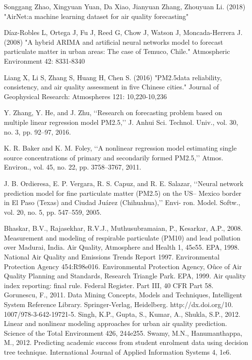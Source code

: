 \begin{thebibliography}{99}
Songgang Zhao, Xingyuan Yuan, Da Xiao, Jianyuan Zhang, Zhouyuan Li. (2018) "AirNet:a machine learning dataset for air quality
forecasting"

Díaz-Robles L, Ortega J, Fu J, Reed G, Chow J, Watson J, Moncada-Herrera J. (2008) "A hybrid ARIMA and artificial neural networks
model to forecast particulate matter in urban areas: The case of Temuco, Chile." Atmospheric Environment 42: 8331-8340

Liang X, Li S, Zhang S, Huang H, Chen S. (2016) "PM2.5data reliability, consistency, and air quality assessment in five Chinese cities."
Journal of Geophysical Research: Atmospheres 121: 10,220-10,236

Y. Zhang, Y. He, and J. Zhu, ‘‘Research on forecasting problem based
on multiple linear regression model PM2.5,’’ J. Anhui Sci. Technol. Univ.,
vol. 30, no. 3, pp. 92–97, 2016.

K. R. Baker and K. M. Foley, ‘‘A nonlinear regression model estimating
single source concentrations of primary and secondarily formed PM2.5,’’
Atmos. Environ., vol. 45, no. 22, pp. 3758–3767, 2011.

J. B. Ordieresa, E. P. Vergara, R. S. Capuz, and R. E. Salazar, ‘‘Neural
network prediction model for fine particulate matter (PM2.5) on the US–
Mexico border in El Paso (Texas) and Ciudad Juárez (Chihuahua),’’ Envi-
ron. Model. Softw., vol. 20, no. 5, pp. 547–559, 2005.

Bhaskar, B.V., Rajasekhar, R.V.J., Muthusubramaian, P., Kesarkar, A.P., 2008. Measurement and modeling of respirable particulate (PM10) and lead pollution over
Madurai, India. Air Quality, Atmosphere and Health 1, 45e55.
EPA, 1998. National Air Quality and Emissions Trends Report 1997. Environmental
Protection Agency 454:R98e016. Environmental Protection Agency, Oûce of Air
Quality Planning and Standards, Research Triangle Park.
EPA, 1999. Air quality index reporting: final rule. Federal Register. Part III, 40 CFR
Part 58.
Gorunescu, F., 2011. Data Mining Concepts, Models and Techniques, Intelligent
System Reference Library. Springer-Verlag, Heidelberg. http://dx.doi.org/10.
1007/978-3-642-19721-5.
Singh, K.P., Gupta, S., Kumar, A., Shukla, S.P., 2012. Linear and nonlinear modeling
approaches for urban air quality prediction. Science of the Total Environment
426, 244e255.
Swamy, M.N., Hanumanthappa, M., 2012. Predicting academic success from student
enrolment data using decision tree technique. International Journal of Applied
Information Systems 4, 1e6.

\end{thebibliography}



